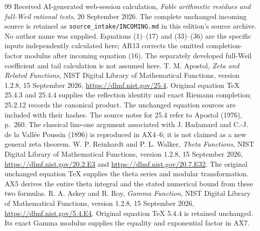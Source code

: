 \documentclass[11pt]{article}
\begin{document}
\begin{thebibliography}{99}
 Received AI-generated web-session calculation,
\emph{Fable arithmetic residues and full-Weil rational tests},
20 September 2026. The complete unchanged incoming source is retained as
\texttt{source\_intake/INCOMING.md} in this edition's source archive.
No author name was supplied. Equations (1)--(17) and (33)--(36)
are the specific inputs independently calculated here; AR13 corrects
the omitted completion-factor modulus after incoming equation (16).
The separately developed full-Weil coefficient and tail calculation
is not assumed here.
 T. M. Apostol, \emph{Zeta and Related Functions},
NIST Digital Library of Mathematical Functions, version 1.2.8,
15 September 2026, \url{https://dlmf.nist.gov/25.4}.
Original equation TeX 25.4.3 and 25.4.4 supplies the reflection
identity and exact Riemann completion; 25.2.12 records the canonical
product. The unchanged equation sources are included with their hashes.
The source notes for 25.4 refer to Apostol (1976), p.~260.
The classical line-one argument associated with J. Hadamard and
C.-J. de la Vall\'ee Poussin (1896) is reproduced in AX4--6;
it is not claimed as a new general zeta theorem.
 W. P. Reinhardt and P. L. Walker,
\emph{Theta Functions}, NIST Digital Library of Mathematical Functions,
version 1.2.8, 15 September 2026,
\url{https://dlmf.nist.gov/20.2.E3} and
\url{https://dlmf.nist.gov/20.7.E32}.
The original unchanged equation TeX supplies the theta series and
modular transformation. AX5 derives the entire theta integral and
the stated numerical bound from these two formulas.
 R. A. Askey and R. Roy,
\emph{Gamma Function}, NIST Digital Library of Mathematical Functions,
version 1.2.8, 15 September 2026,
\url{https://dlmf.nist.gov/5.4.E4}.
Original equation TeX 5.4.4 is retained unchanged. Its exact
Gamma modulus supplies the equality and exponential factor in AX7.



\end{thebibliography}
\end{document}
